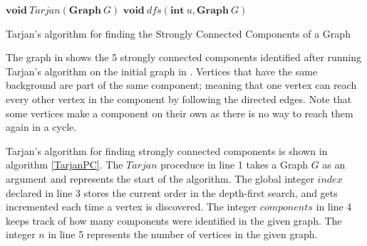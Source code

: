 \documentclass{l4proj}
\begin{document}

\begin{algorithm}[H]
\DontPrintSemicolon
\nl $\textbf{void} ~\mathit{Tarjan}(\textbf{Graph}~G)$ \;
\nl {}
\;
\nl $\textbf{void} ~\mathit{dfs}(\textbf{int}~u, \textbf{Graph}~G)$ \;
\nl {}
\caption{Tarjan's algorithm \cite{tarjan1972depth} for finding the Strongly Connected Components of a Graph}
\label{TarjanPC}
\end{algorithm}

\noindent The graph in  shows the 5 strongly connected components identified after running Tarjan’s algorithm \cite{tarjan1972depth} on the initial graph in . Vertices that have the same background are part of the same component; meaning that one vertex can reach every other vertex in the component by following the directed edges. Note that some vertices make a component on their own as there is no way to reach them again in a cycle.

\noindent Tarjan's algorithm \cite{tarjan1972depth} for finding strongly connected components is shown in algorithm \ref{TarjanPC}. The $Tarjan$ proceduce in line 1 takes a Graph $G$ as an argument and represents the start of the algorithm. The global integer $index$ declared in line 3 stores the current order in the depth-first search, and gets incremented each time a vertex is discovered. The integer $components$ in line 4 keeps track of how many components were identified in the given graph. The integer $n$ in line 5 represents the number of vertices in the given graph.
\end{document}

